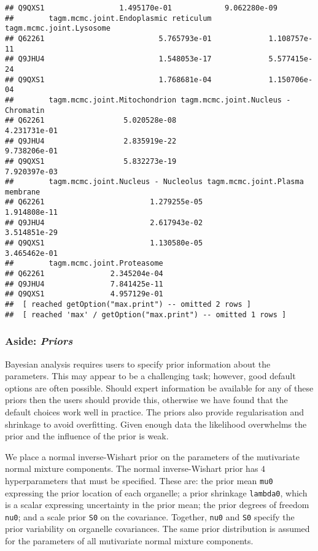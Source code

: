 \documentclass[9pt,a4paper,]{extarticle}
\begin{document}
\begin{verbatim}
## Q9QXS1                 1.495170e-01            9.062280e-09
##        tagm.mcmc.joint.Endoplasmic reticulum tagm.mcmc.joint.Lysosome
## Q62261                          5.765793e-01             1.108757e-11
## Q9JHU4                          1.548053e-17             5.577415e-24
## Q9QXS1                          1.768681e-04             1.150706e-04
##        tagm.mcmc.joint.Mitochondrion tagm.mcmc.joint.Nucleus - Chromatin
## Q62261                  5.020528e-08                        4.231731e-01
## Q9JHU4                  2.835919e-22                        9.738206e-01
## Q9QXS1                  5.832273e-19                        7.920397e-03
##        tagm.mcmc.joint.Nucleus - Nucleolus tagm.mcmc.joint.Plasma membrane
## Q62261                        1.279255e-05                    1.914808e-11
## Q9JHU4                        2.617943e-02                    3.514851e-29
## Q9QXS1                        1.130580e-05                    3.465462e-01
##        tagm.mcmc.joint.Proteasome
## Q62261               2.345204e-04
## Q9JHU4               7.841425e-11
## Q9QXS1               4.957129e-01
##  [ reached getOption("max.print") -- omitted 2 rows ]
##  [ reached 'max' / getOption("max.print") -- omitted 1 rows ]
\end{verbatim}

\hypertarget{aside-priors}{%
\subsubsection*{\texorpdfstring{Aside: \emph{Priors}}{Aside: Priors}}\label{aside-priors}}

Bayesian analysis requires users to specify prior information about
the parameters. This may appear to be a challenging task; however,
good default options are often possible. Should expert information be
available for any of these priors then the users should provide this,
otherwise we have found that the default choices work well in
practice. The priors also provide regularisation and shrinkage to
avoid overfitting. Given enough data the likelihood overwhelms the
prior and the influence of the prior is weak.

We place a normal inverse-Wishart prior on the parameters of the
mutivariate normal mixture components. The normal inverse-Wishart
prior has \(4\) hyperparameters that must be specified. These are: the
prior mean \texttt{mu0} expressing the prior location of each organelle; a
prior shrinkage \texttt{lambda0}, which is a scalar expressing uncertainty in
the prior mean; the prior degrees of freedom \texttt{nu0}; and a scale prior
\texttt{S0} on the covariance. Together, \texttt{nu0} and \texttt{S0} specify the prior
variability on organelle covariances. The same prior distribution is
assumed for the parameters of all mutivariate normal mixture
components.
\end{document}
